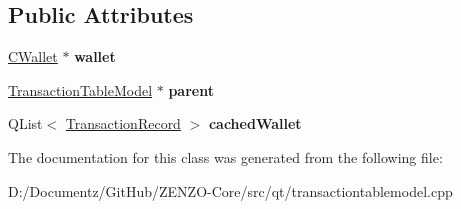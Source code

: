 \subsection*{Public Attributes}
\begin{DoxyCompactItemize}
\item 
\mbox{\label{class_transaction_table_priv_a01cb7d238e5dea44b9f7f1ee75d5849d}} 
\mbox{\hyperlink{class_c_wallet}{C\+Wallet}} $\ast$ {\bfseries wallet}
\item 
\mbox{\label{class_transaction_table_priv_a358d460cf7c3074fba12d03cdc5f638d}} 
\mbox{\hyperlink{class_transaction_table_model}{Transaction\+Table\+Model}} $\ast$ {\bfseries parent}
\item 
\mbox{\label{class_transaction_table_priv_a410380e0d05152cf1d121f0ba0727ea8}} 
Q\+List$<$ \mbox{\hyperlink{class_transaction_record}{Transaction\+Record}} $>$ {\bfseries cached\+Wallet}
\end{DoxyCompactItemize}


The documentation for this class was generated from the following file\+:\begin{DoxyCompactItemize}
\item 
D\+:/\+Documentz/\+Git\+Hub/\+Z\+E\+N\+Z\+O-\/\+Core/src/qt/transactiontablemodel.\+cpp\end{DoxyCompactItemize}
